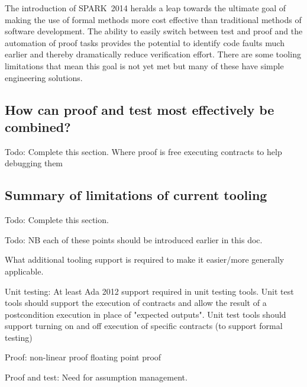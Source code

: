 \documentclass{llncs}
\newcommand{\newspark}{SPARK~2014\xspace}
\begin{document}
The introduction of \newspark heralds a leap towards the ultimate goal
of making the use of formal methods more cost effective than
traditional methods of software development. The ability to easily
switch between test and proof and the automation of proof tasks
provides the potential to identify code faults much earlier and
thereby dramatically reduce verification effort. There are some
tooling limitations that mean this goal is not yet met but many of
these have simple engineering solutions.

\subsection{How can proof and test most effectively be combined?}
Todo: Complete this section. Where proof is free executing contracts
to help debugging them

\subsection{Summary of limitations of current tooling}

Todo: Complete this section.

Todo: NB each of these points should be introduced earlier in this
doc.

What additional tooling support is required to make it easier/more
generally applicable.

Unit testing: At least Ada 2012 support required in unit testing
tools. Unit test tools should support the execution of contracts and
allow the result of a postcondition execution in place of "expected
outputs". Unit test tools should support turning on and off execution
of specific contracts (to support formal testing)

Proof: non-linear proof floating point proof

Proof and test: Need for assumption management.



\end{document}
